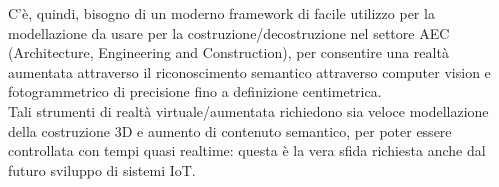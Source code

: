 C'è, quindi, bisogno di un moderno framework di facile utilizzo per la modellazione da usare per la
costruzione/decostruzione nel settore AEC (Architecture, Engineering and Construction),
per consentire una realtà aumentata attraverso il riconoscimento semantico attraverso computer vision e
fotogrammetrico di precisione fino a definizione centimetrica.\\
Tali strumenti di realtà virtuale/aumentata
richiedono sia veloce modellazione della costruzione 3D e aumento di contenuto semantico, per poter essere controllata con
tempi quasi realtime: questa è la vera sfida richiesta anche dal futuro sviluppo di sistemi IoT.


